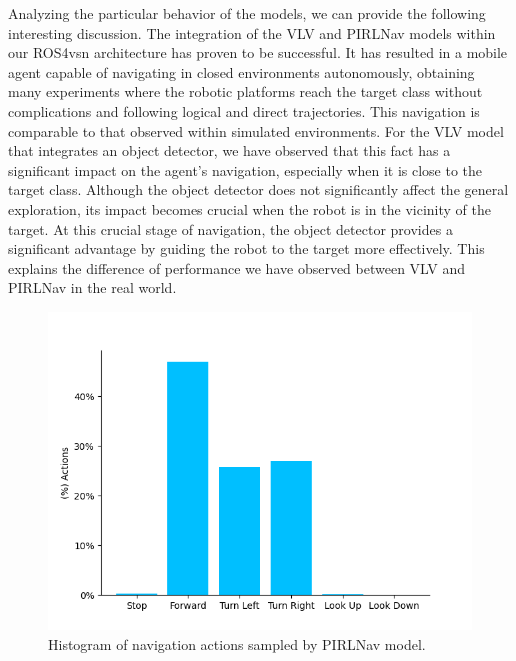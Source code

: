 Analyzing the particular behavior of the models, we can provide the following interesting discussion.
The integration of the VLV and PIRLNav models within our ROS4\acrshort{vsn} architecture has proven to be successful.
It has resulted in a mobile agent capable of navigating in closed environments autonomously, obtaining many experiments where the robotic platforms reach the target class without complications and following logical and direct trajectories.
This navigation is comparable to that observed within simulated environments.
For the VLV model that integrates an object detector, we have observed that this fact has a significant impact on the agent's navigation, especially when it is close to the target class.
Although the object detector does not significantly affect the general exploration, its impact becomes crucial when the robot is in the vicinity of the target.
At this crucial stage of navigation, the object detector provides a significant advantage by guiding the robot to the target more effectively.
This explains the difference of performance we have observed between VLV and PIRLNav in the real world.

\begin{figure}[t]
    \centering
        \includegraphics[width=\linewidth]{figures/ros4vsn/histograma_PIRLNav}
        \caption{Histogram of navigation actions sampled by PIRLNav model.}
        \label{fig:histrogram_pirlnav}
\end{figure}

